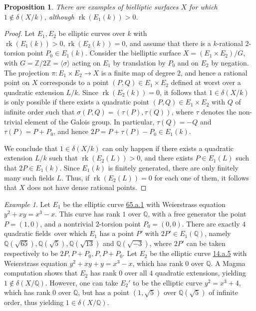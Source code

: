\documentclass[a4paper,11pt]{amsart}
\theoremstyle{plain}
\newtheorem{prop}[thm]{Proposition}
\theoremstyle{remark}
\newtheorem{example}[thm]{Example}
\newcommand{\bQ}{\mathbb{Q}}
\newcommand{\bZ}{\mathbb{Z}}
\newcommand{\rk}{\operatorname{rk}}
\newcommand{\dendegs}{\delta}
\begin{document}
\begin{prop}\label{prop:strictbiellipticbound}
    There are examples of bielliptic surfaces $X$ for which  $1\not\in\dendegs(X/k)$, although $\rk(E_1(k))>0$. 
\end{prop}
\begin{proof}
Let $E_1, E_2$ be elliptic curves over $k$ with $\rk(E_1(k))>0, 
 \rk(E_2(k))=0$, and assume that there is a $k$-rational $2$-torsion point $P_0\in E_1(k)$. Consider the bielliptic surface $X=(E_1\times E_2)/G$, with $G=\bZ/2\bZ=\langle\sigma\rangle$ acting on $E_1$ by translation by $P_0$ and on $E_2$ by negation. The projection $\pi:E_1\times E_2\to X$ is a finite map of degree $2$, and hence a rational point on $X$ corresponds to a point $(P,Q)\in E_1\times E_2$ defined at worst over a quadratic extension $L/k$. Since $\rk(E_2(k))=0$, it follows that $1\in\dendegs(X/k)$ is only possible if there exists a quadratic point $(P, Q)\in E_1\times E_2$ with $Q$ of infinite order such that $\sigma(P, Q) = (\tau(P), \tau(Q))$, where $\tau$ denotes the non-trivial element of the Galois group. In particular, $\tau(Q) = -Q$ and $\tau(P)= P + P_0$, and hence $2P = P+\tau(P)- P_0\in E_1(k)$.

We conclude that $1\in\dendegs(X/k)$ can only happen if there exists a quadratic extension $L/k$ such that $\rk(E_2(L))>0$, and there exists $P \in E_1(L)$ such that $2P \in E_1(k)$. Since $E_1(k)$ is finitely generated, there are only finitely many such fields $L$. Thus, if $\rk(E_2(L))=0$ for each one of them, it follows that $X$ does not have dense rational points. 
\end{proof}

\begin{example}\label{ex:strictbielliptic}
Let $E_1$ be the elliptic curve \href{https://www.lmfdb.org/EllipticCurve/Q/65/a/1}{65.a.1} with Weierstrass equation $y^2 + xy = x^3 - x$. This curve has rank $1$ over $\bQ$, with a free generator the point $P=(1,0)$, and a nontrivial $2$-torsion point $P_0=(0,0)$. There are exactly $4$ quadratic fields over which $E_1$ has a point $P'$ with $2P' \in E_1(\bQ)$, namely $\bQ(\sqrt{65}), \bQ(\sqrt{5}), \bQ(\sqrt{13})$ and $\bQ(\sqrt{-3})$, where $2P'$ can be taken respectively to be $2P, P+P_0, P, P+P_0$. Let $E_2$ be the elliptic curve \href{https://www.lmfdb.org/EllipticCurve/Q/14/a/5}{14.a.5} with Weierstrass equation $y^2 + xy + y = x^3 - x$, which has rank $0$ over $\bQ$. A Magma computation shows that $E_2$ has rank $0$ over all $4$ quadratic extensions, yielding $1\not\in\dendegs(X/\bQ)$. 
However, one can take $E_2'$ to be the elliptic curve $y^2=x^3+4$, which has rank $0$ over $\bQ$, but has a point $(1,\sqrt{5})$ over $\bQ(\sqrt{5})$ of infinite order, thus yielding $1\in \dendegs(X/\bQ)$. 
\end{example}
\end{document}
